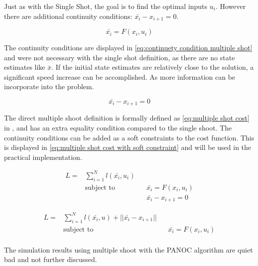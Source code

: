 			Just as with the Single Shot, the goal is to find the optimal inputs $u_i$. However there are additional continuity conditions: $\bar{x_i} - x_{i+1} = 0$.
			
			\begin{equation}
				\bar{x_i} = F(x_i,u_i)
				\label{eq:}
			\end{equation}
			
			The continuity conditions are displayed in \eqref{eq:continuety condition multiple shot} and were not necessary with the single shot definition, as there are no state estimates like $\bar{x}$. If the initial state estimates are relatively close to the solution, a significant speed increase can be accomplished. As more information can be incorporate into the problem.
			
			\begin{equation}
				\bar{x_i} - x_{i+1} = 0
				\label{eq:continuety condition multiple shot}
			\end{equation}
			
			The direct multiple shoot definition is formally defined as \eqref{eq:multiple shot cost} in \cite{Diehl2005}, and has an extra equality condition compared to the single shoot. The continuity conditions can be added as a soft constraints to the cost function. This is displayed in \eqref{eq:multiple shot cost with soft constraint} and will be used in the practical implementation.
			
			\begin{equation}
				\begin{aligned}
				L =  & \sum_{i=1}^{N} l(\bar{x_i},u_i) \\
				& \text{subject to}			&& \bar{x_i} = F(x_i,u_i) \\
				& 							&& \bar{x_i} - x_{i+1} = 0
				\end{aligned}
				\label{eq:multiple shot cost}
			\end{equation}
			
			\begin{equation}
			\begin{aligned}
			L =  & \sum_{i=1}^{N} l(\bar{x_i},u) + ||\bar{x_i} - x_{i+1}||\\
			& \text{subject to}			&& \bar{x_i} = F(x_i,u_i) \\
			\end{aligned}
			\label{eq:multiple shot cost with soft constraint}
			\end{equation}
			
			The simulation results using multiple shoot with the PANOC algorithm are quiet bad and not further discussed.
